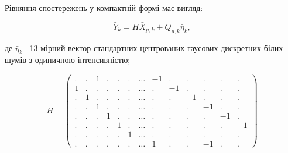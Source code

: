 Рівняння спостережень у компактній  формі має вигляд:

\[\bar{Y}_{k} =H\bar{X}_{p,k} +Q_{p,k} \bar{\eta }_{k} ,\] 

де $\bar{\eta }_{k} $-- 13-мірний вектор стандартних центрованих гаусових дискретних 
білих шумів з одиничною інтенсивністю;

\[H=\left(\begin{array}{ccccccccccccc}    
{.} & {.} & {1} & {.} & {.} & {.} & {\ldots } & {-1} & {.} & {.} & {.} & {.} & {.} \\ 
{1} & {.} & {.} & {.} & {.} & {.} & {\ldots } & {.} & {-1} & {.} & {.} & {.} & {.} \\ 
{.} & {1} & {.} & {.} & {.} & {.} & {\ldots } & {.} & {.} & {-1} & {.} & {.} & {.} \\ 
{.} & {.} & {1} & {.} & {.} & {.} & {\ldots } & {.} & {.} & {.} & {-1} & {.} & {.} \\ 
{.} & {.} & {.} & {1} & {.} & {.} & {\ldots } & {.} & {.} & {.} & {.} & {-1} & {.} \\ 
{.} & {.} & {.} & {.} & {1} & {.} & {\ldots } & {.} & {.} & {.} & {.} & {.} & {-1} \\ 
{.} & {.} & {.} & {.} & {.} & {1} & {\ldots } & {.} & {.} & {.} & {.} & {.} & {.} \\ 
{.} & {.} & {.} & {.} & {.} & {.} & {\ldots } & {1} & {.} & {.} & {-1} & {.} & {.} 
\end{array}\right)\] 


